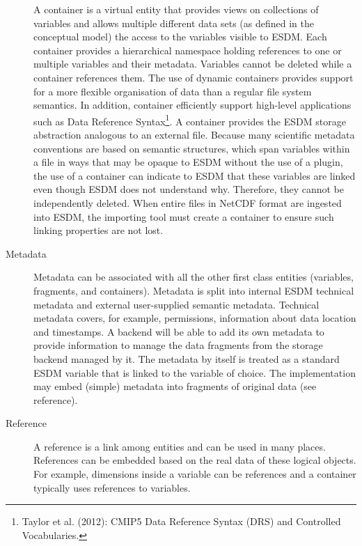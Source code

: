\begin{description}
A container is a virtual entity that provides views on collections of variables and allows multiple different data sets (as defined in the conceptual model) the access to the variables visible to ESDM.  Each container provides a hierarchical namespace holding references to one or multiple variables and their metadata. Variables cannot be deleted while a container references them.  The use of dynamic containers provides support for a more flexible organisation of data than a regular file system semantics. In addition, container efficiently support high-level applications such as Data Reference Syntax\footnote{Taylor et al. (2012): CMIP5 Data Reference Syntax (DRS) and
Controlled Vocabularies.}.
A container provides the ESDM storage abstraction analogous to an external file. Because many scientific metadata conventions are based on semantic structures, which span variables within a file in ways that may be opaque to ESDM without the use of a plugin, the use of a container can indicate to ESDM that these variables are linked even though ESDM does not understand why. Therefore, they cannot be independently deleted.
When entire files in NetCDF format are ingested into ESDM, the importing tool must create a container to ensure such linking properties are not lost.

\item[Metadata]

Metadata can be associated with all the other first class entities (variables, fragments, and containers). Metadata is split into internal ESDM technical metadata and external user-supplied semantic metadata.
Technical metadata covers, for example, permissions, information about data location and timestamps.
A backend will be able to add its own metadata to provide information to manage the data fragments from the storage backend managed by it.
The metadata by itself is treated as a standard ESDM variable that is linked to the variable of choice.
The implementation may embed (simple) metadata into fragments of original data (see reference).

\item[Reference]

A reference is a link among entities and can be used in many places.
References can be embedded based on the real data of these logical objects.
For example, dimensions inside a variable can be references and a container typically uses references to variables.

\end{description}


